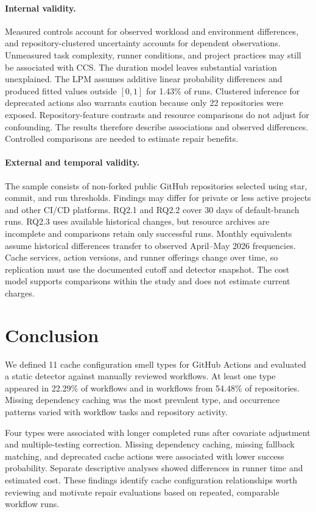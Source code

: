 \documentclass[smallextended]{svjour3}
\begin{document}
\paragraph{Internal validity.}
Measured controls account for observed workload and environment differences, and repository-clustered uncertainty accounts for dependent observations. Unmeasured task complexity, runner conditions, and project practices may still be associated with CCS. The duration model leaves substantial variation unexplained. The LPM assumes additive linear probability differences and produced fitted values outside $[0,1]$ for 1.43\% of runs. Clustered inference for deprecated actions also warrants caution because only 22 repositories were exposed. Repository-feature contrasts and resource comparisons do not adjust for confounding. The results therefore describe associations and observed differences. Controlled comparisons are needed to estimate repair benefits.

\paragraph{External and temporal validity.}
The sample consists of non-forked public GitHub repositories selected using star, commit, and run thresholds. Findings may differ for private or less active projects and other CI/CD platforms. RQ2.1 and RQ2.2 cover 30 days of default-branch runs. RQ2.3 uses available historical changes, but resource archives are incomplete and comparisons retain only successful runs. Monthly equivalents assume historical differences transfer to observed April--May 2026 frequencies. Cache services, action versions, and runner offerings change over time, so replication must use the documented cutoff and detector snapshot. The cost model supports comparisons within the study and does not estimate current charges.

\section{Conclusion}
\label{sec:conclusion}

We defined 11 cache configuration smell types for GitHub Actions and evaluated a static detector against manually reviewed workflows. At least one type appeared in 22.29\% of workflows and in workflows from 54.48\% of repositories. Missing dependency caching was the most prevalent type, and occurrence patterns varied with workflow tasks and repository activity.

Four types were associated with longer completed runs after covariate adjustment and multiple-testing correction. Missing dependency caching, missing fallback matching, and deprecated cache actions were associated with lower success probability. Separate descriptive analyses showed differences in runner time and estimated cost. These findings identify cache configuration relationships worth reviewing and motivate repair evaluations based on repeated, comparable workflow runs.



\end{document}
